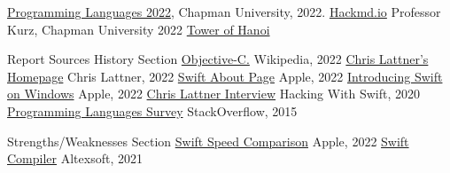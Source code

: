 \documentclass{article}
\theoremstyle{theorem}
\theoremstyle{definition}
\theoremstyle{remark}
\begin{document}
\begin{thebibliography}{99}
 \href{https://github.com/alexhkurz/programming-languages-2022/blob/main/README.md}{Programming Languages 2022}, Chapman University, 2022.\newline
\newline
\href{https://hackmd.io/@alexhkurz/H1jUka4Gv#fn2}{Hackmd.io} Professor Kurz, Chapman University 2022\newline\newline
\href{https://www.mathsisfun.com/games/towerofhanoi.html}{Tower of Hanoi}\newline

Report Sources\newline
History Section\newline
\href{https://en.wikipedia.org/wiki/Objective-C#:~:text=10%20External%20links-,History,Programming%20Technology%20Center%20in%201981.}{Objective-C.} Wikipedia, 2022\newline
\href{https://nondot.org/~sabre/}{Chris Lattner's Homepage} Chris Lattner, 2022\newline
\href{https://www.swift.org/about/}{Swift About Page} Apple, 2022\newline
\href{https://www.swift.org/blog/swift-on-windows/}{Introducing Swift on Windows} Apple, 2022\newline
\href{https://www.hackingwithswift.com/interviews/chris-lattner-how-did-you-start-creating-swift}{Chris Lattner Interview} Hacking With Swift, 2020\newline
\href{https://stackoverflow.blog/2015/04/07/stack-overflow-developer-survey-2015-the-results/}{Programming Languages Survey} StackOverflow, 2015\newline

Strengths/Weaknesses Section\newline
\href{https://www.apple.com/swift/}{Swift Speed Comparison} Apple, 2022\newline
\href{https://www.altexsoft.com/blog/engineering/the-good-and-the-bad-of-swift-programming-language/}{Swift Compiler} Altexsoft, 2021

\end{thebibliography}
\end{document}
